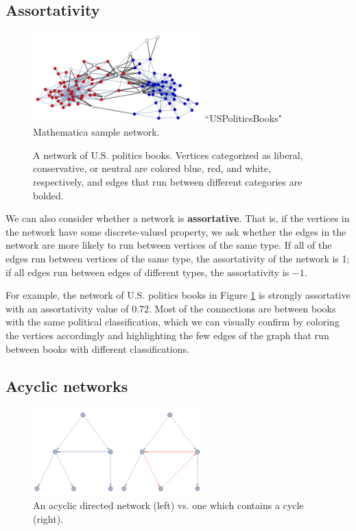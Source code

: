 \documentclass[12pt]{thesis}
\theoremstyle{plain}
\theoremstyle{definition}
\theoremstyle{remark}
\begin{document}
\subsection{Assortativity}

\begin{figure}
\centering
\vspace{-20pt}
\includegraphics[width=0.58\textwidth]{assortativity_demo.png}
\scriptsize
``USPoliticsBooks" Mathematica sample network.
\caption{A network of U.S. politics books. Vertices categorized as liberal, conservative, or neutral are colored blue, red, and white, respectively, and edges that run between different categories are bolded.}
\label{fig:assortativity_demo}
\end{figure}

We can also consider whether a network is \textbf{assortative}. That is, if the vertices in the network have some discrete-valued property, we ask whether the edges in the network are more likely to run between vertices of the same type. If all of the edges run between vertices of the same type, the assortativity of the network is 1; if all edges run between edges of different types, the assortativity is $-1$.

For example, the network of U.S. politics books in Figure \ref{fig:assortativity_demo} is strongly assortative with an assortativity value of $0.72$. Most of the connections are between books with the same political classification, which we can visually confirm by coloring the vertices accordingly and highlighting the few edges of the graph that run between books with different classifications.




\subsection{Acyclic networks}

\begin{figure}[h]
\centering
\includegraphics[width=0.58\textwidth]{acyclic_demo.png}
\caption{An acyclic directed network (left) vs. one which contains a cycle (right).}
\label{fig:acyclic_demo}
\end{figure}
\end{document}
